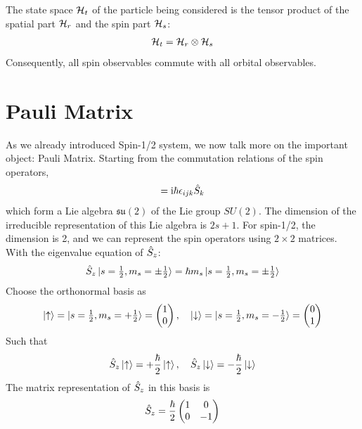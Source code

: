 The state space $\mathcal{H}_t$ of the particle being considered is the tensor product of the spatial part $\mathcal{H}_r$ and the spin part $\mathcal{H}_s$:
\begin{align}
    \mathcal{H}_t = \mathcal{H}_r \otimes \mathcal{H}_s \label{eq:total_space}
\end{align}
Consequently, all spin observables commute with all orbital observables. 



\section{Pauli Matrix}

As we already introduced Spin-1/2 system, we now talk more on the important object: Pauli Matrix. Starting from the commutation relations of the spin operators, 
\begin{align}
    [\oS_i, \oS_j] = \ii \hbar \epsilon_{ijk} \oS_k
\end{align}
which form a Lie algebra $\mathfrak{su}(2)$ of the Lie group $SU(2)$. The dimension of the irreducible representation of this Lie algebra is $2s+1$. For spin-1/2, the dimension is 2, and we can represent the spin operators using $2 \times 2$ matrices. With the eigenvalue equation of $\hat{S}_z$: 
\begin{align}
    \hat{S}_z \ket{s= \tfrac12, m_s = \pm \tfrac12} = \hbar m_s \ket{s= \tfrac12, m_s = \pm \tfrac12}
\end{align}
Choose the orthonormal basis as
\begin{align}
    \ket{\uparrow} = \ket{s= \tfrac12, m_s = + \tfrac12} = \begin{pmatrix} 1 \\ 0 \end{pmatrix}, \quad \ket{\downarrow} = \ket{s= \tfrac12, m_s = - \tfrac12} = \begin{pmatrix} 0 \\ 1 \end{pmatrix}
\end{align}
Such that 
\begin{align}
    \hat{S}_z \ket{\uparrow} = + \frac{\hbar}{2} \ket{\uparrow}, \quad \hat{S}_z \ket{\downarrow} = - \frac{\hbar}{2} \ket{\downarrow}
\end{align}
The matrix representation of $\hat{S}_z$ in this basis is
\begin{align}
    \hat{S}_z = \frac{\hbar}{2} \begin{pmatrix} 1 & 0 \\ 0 & -1 \end{pmatrix}
\end{align}
